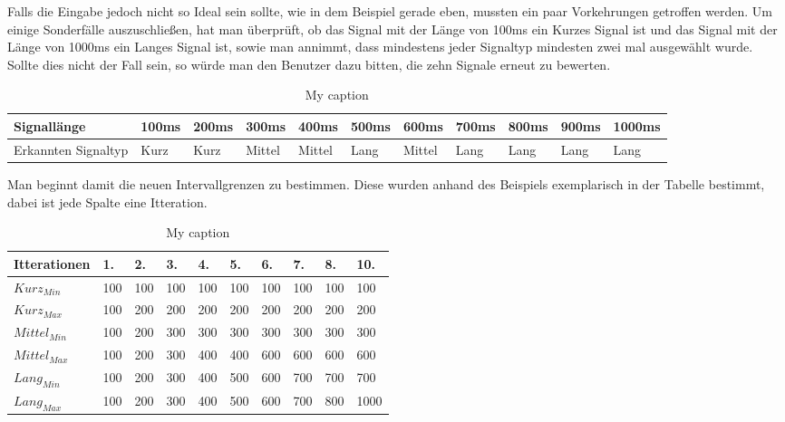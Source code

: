 Falls die Eingabe jedoch nicht so Ideal sein sollte, wie in dem Beispiel gerade eben, mussten ein paar Vorkehrungen getroffen werden. Um einige Sonderf{\"a}lle auszuschlie{\ss}en, hat man {\"u}berpr{\"u}ft, ob das Signal mit der L{\"a}nge von 100ms ein Kurzes Signal ist und das Signal mit der L{\"a}nge von 1000ms ein Langes Signal ist, sowie man annimmt, dass mindestens jeder Signaltyp mindesten zwei mal ausgew{\"a}hlt wurde. Sollte dies nicht der Fall sein, so w{\"u}rde man den Benutzer dazu bitten, die zehn Signale erneut zu bewerten. 

\begin{table}[]
\centering
\caption{My caption}
\label{my-label}
\begin{tabular}{|l|l|l|l|l|l|l|l|l|l|l|}
\hline
 Signall{\"a}nge & 100ms & 200ms & 300ms & 400ms & 500ms & 600ms & 700ms & 800ms & 900ms & 1000ms \\ \hline
 Erkannten Signaltyp & Kurz & Kurz & Mittel & Mittel & Lang & Mittel & Lang & Lang & Lang & Lang \\ \hline
\end{tabular}
\end{table}

Man beginnt damit die neuen Intervallgrenzen zu bestimmen. Diese wurden anhand des Beispiels exemplarisch in der Tabelle bestimmt, dabei ist jede Spalte eine Itteration.

\begin{table}[]
\centering
\caption{My caption}
\label{my-label}
\begin{tabular}{|l|l|l|l|l|l|l|l|l|l|}
\hline
Itterationen            & 1. & 2. & 3. & 4. & 5. & 6. & 7. & 8. & 10. \\ \hline
$Kurz_{Min}$   & 100          & 100          & 100          & 100          & 100          & 100          & 100          & 100          & 100           \\ \hline
$Kurz_{Max}$   & 100          & 200          & 200          & 200          & 200          & 200          & 200          & 200          & 200           \\ \hline
$Mittel_{Min}$ & 100          & 200          & 300          & 300          & 300          & 300          & 300          & 300          & 300           \\ \hline
$Mittel_{Max}$ & 100          & 200          & 300          & 400          & 400          & 600          & 600          & 600          & 600           \\ \hline
$Lang_{Min}$   & 100          & 200          & 300          & 400          & 500          & 600          & 700          & 700          & 700           \\ \hline
$Lang_{Max}$   & 100          & 200          & 300          & 400          & 500          & 600          & 700          & 800          & 1000          \\ \hline
\end{tabular}
\end{table}

